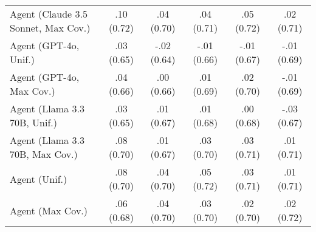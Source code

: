 \begin{table}[h!]
\begin{tabular}{lccccc}
    Agent (Claude 3.5 Sonnet, Max Cov.) & \cellcolor{gold!30}.10 {\small (0.72)} & .04 {\small (0.70)} & .04 {\small (0.71)} & \cellcolor{gold!30}.05 {\small (0.72)} & .02 {\small (0.71)} \\
    Agent (GPT-4o, Unif.) & .03 {\small (0.65)} & -.02 {\small (0.64)} & -.01 {\small (0.66)} & -.01 {\small (0.67)} & -.01 {\small (0.69)} \\
    Agent (GPT-4o, Max Cov.) & .04 {\small (0.66)} & .00 {\small (0.66)} & .01 {\small (0.69)} & .02 {\small (0.70)} & -.01 {\small (0.69)} \\
    Agent (Llama 3.3 70B, Unif.) & .03 {\small (0.65)} & .01 {\small (0.67)} & .01 {\small (0.68)} & .00 {\small (0.68)} & -.03 {\small (0.67)} \\
    Agent (Llama 3.3 70B, Max Cov.) & .08 {\small (0.70)} & .01 {\small (0.67)} & .03 {\small (0.70)} & .03 {\small (0.71)} & .01 {\small (0.71)} \\
    Agent (Unif.) & .08 {\small (0.70)} & .04 {\small (0.70)} & \cellcolor{silver!30}.05 {\small (0.72)} & .03 {\small (0.71)} & .01 {\small (0.71)} \\
    Agent (Max Cov.) & .06 {\small (0.68)} & \cellcolor{silver!30}.04 {\small (0.70)} & .03 {\small (0.70)} & .02 {\small (0.70)} & .02 {\small (0.72)} \\
    \bottomrule
    \end{tabular}
\end{table}